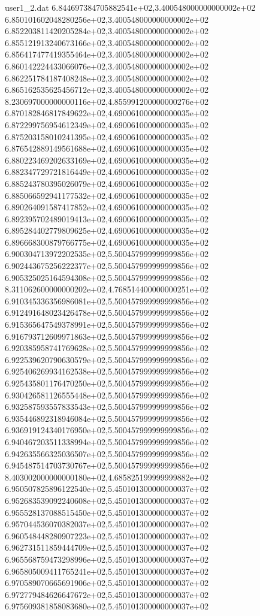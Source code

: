 \begin{filecontents}{user1_2.dat}
6.844697384705882541e+02,3.400548000000000002e+02
6.850101602048280256e+02,3.400548000000000002e+02
6.852203811420205284e+02,3.400548000000000002e+02
6.855121913240673166e+02,3.400548000000000002e+02
6.856417477419355464e+02,3.400548000000000002e+02
6.860142224433066076e+02,3.400548000000000002e+02
6.862251784187408248e+02,3.400548000000000002e+02
6.865162535625456712e+02,3.400548000000000002e+02
8.230697000000000116e+02,4.855991200000000276e+02
6.870182846817849622e+02,4.690061000000000035e+02
6.872299756954612349e+02,4.690061000000000035e+02
6.875203158010241395e+02,4.690061000000000035e+02
6.876542889149561688e+02,4.690061000000000035e+02
6.880223469202633169e+02,4.690061000000000035e+02
6.882347729721816449e+02,4.690061000000000035e+02
6.885243780395026079e+02,4.690061000000000035e+02
6.885066592941177532e+02,4.690061000000000035e+02
6.890264091587417852e+02,4.690061000000000035e+02
6.892395702489019413e+02,4.690061000000000035e+02
6.895284402779809625e+02,4.690061000000000035e+02
6.896668300879766775e+02,4.690061000000000035e+02
6.900304713972202535e+02,5.500457999999999856e+02
6.902443675256222377e+02,5.500457999999999856e+02
6.905325025164594308e+02,5.500457999999999856e+02
8.311062600000000202e+02,4.768514400000000251e+02
6.910345336356986081e+02,5.500457999999999856e+02
6.912491648023426478e+02,5.500457999999999856e+02
6.915365647549378991e+02,5.500457999999999856e+02
6.916793712609971863e+02,5.500457999999999856e+02
6.920385958741769628e+02,5.500457999999999856e+02
6.922539620790630579e+02,5.500457999999999856e+02
6.925406269934162538e+02,5.500457999999999856e+02
6.925435801176470250e+02,5.500457999999999856e+02
6.930426581126555448e+02,5.500457999999999856e+02
6.932587593557833543e+02,5.500457999999999856e+02
6.935446892318946084e+02,5.500457999999999856e+02
6.936919124340176950e+02,5.500457999999999856e+02
6.940467203511338994e+02,5.500457999999999856e+02
6.942635566325036507e+02,5.500457999999999856e+02
6.945487514703730767e+02,5.500457999999999856e+02
8.403002000000000180e+02,4.685825199999999882e+02
6.950507825896122540e+02,5.450101300000000037e+02
6.952683539092240608e+02,5.450101300000000037e+02
6.955528137088515450e+02,5.450101300000000037e+02
6.957044536070382037e+02,5.450101300000000037e+02
6.960548448280907223e+02,5.450101300000000037e+02
6.962731511859444709e+02,5.450101300000000037e+02
6.965568759473298996e+02,5.450101300000000037e+02
6.965805009411765241e+02,5.450101300000000037e+02
6.970589070665691906e+02,5.450101300000000037e+02
6.972779484626647672e+02,5.450101300000000037e+02
6.975609381858083680e+02,5.450101300000000037e+02

\end{filecontents}

